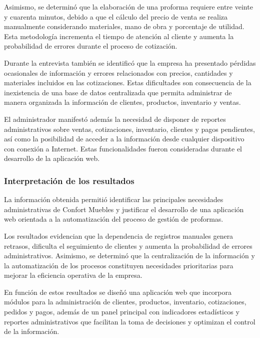 Asimismo, se determinó que la elaboración de una proforma requiere entre veinte y cuarenta minutos, debido a que el cálculo del precio de venta se realiza manualmente considerando materiales, mano de obra y porcentaje de utilidad. Esta metodología incrementa el tiempo de atención al cliente y aumenta la probabilidad de errores durante el proceso de cotización.

Durante la entrevista también se identificó que la empresa ha presentado pérdidas ocasionales de información y errores relacionados con precios, cantidades y materiales incluidos en las cotizaciones. Estas dificultades son consecuencia de la inexistencia de una base de datos centralizada que permita administrar de manera organizada la información de clientes, productos, inventario y ventas.

El administrador manifestó además la necesidad de disponer de reportes administrativos sobre ventas, cotizaciones, inventario, clientes y pagos pendientes, así como la posibilidad de acceder a la información desde cualquier dispositivo con conexión a Internet. Estas funcionalidades fueron consideradas durante el desarrollo de la aplicación web.
\subsubsection*{Interpretación de los resultados}

La información obtenida permitió identificar las principales necesidades administrativas de Confort Muebles y justificar el desarrollo de una aplicación web orientada a la automatización del proceso de gestión de proformas.

Los resultados evidencian que la dependencia de registros manuales genera retrasos, dificulta el seguimiento de clientes y aumenta la probabilidad de errores administrativos. Asimismo, se determinó que la centralización de la información y la automatización de los procesos constituyen necesidades prioritarias para mejorar la eficiencia operativa de la empresa.

En función de estos resultados se diseñó una aplicación web que incorpora módulos para la administración de clientes, productos, inventario, cotizaciones, pedidos y pagos, además de un panel principal con indicadores estadísticos y reportes administrativos que facilitan la toma de decisiones y optimizan el control de la información.
